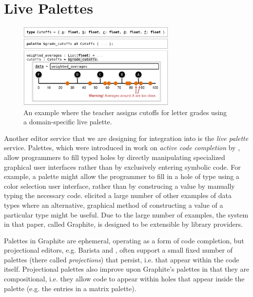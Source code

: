 
\section{Live Palettes}
\label{sec:palettes}


\begin{figure}[t]
\vspace{-4px}
\includegraphics[width=0.7\textwidth]{images/cutoffs-new-elided.png}
\caption{An example where the teacher assigns cutoffs 
for letter grades using a domain-specific live palette.}
\label{fig:cutoffs-example}
\vspace{-7px}
\end{figure}

Another editor service that we are designing for integration into \Hazel 
is the \emph{live palette} service.
Palettes, which were introduced in work on
\emph{active code completion} by \citet{ActiveCodeCompletion},  allow programmers to fill typed 
holes by directly manipulating specialized graphical user interfaces rather than by exclusively entering symbolic
code. For example, a palette might allow the programmer to 
fill in a hole of type  using a color selection  
user interface, rather than by construcing a  value  
by manually typing the necessary code. \citet{ActiveCodeCompletion} elicited a large number of other
examples of data types where an alternative, graphical 
method of constructing a value of a particular type might be
useful. Due to the large number of examples, the system in that paper, called {Graphite}, is designed to be extensible by library providers. 

Palettes in {Graphite} 
are ephemeral, operating as a form of code completion, but projectional editors, e.g. Barista \cite{ko_barista:_2006} and  \cite{voelter_mbeddr:_2012}, often support a small fixed number of  
palettes (there called \emph{projections}) that persist, i.e. that appear within the code itself. 
Projectional palettes also improve upon Graphite's palettes in that they are compositional, i.e. they allow code to appear within holes that appear inside the palette (e.g. the entries in a matrix palette). 

